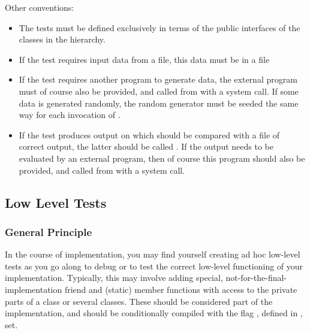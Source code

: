 Other conventions:

\begin{itemize}
\item
The tests must be defined exclusively in terms of the
public interfaces of the classes in the hierarchy.

\item
If the test requires input data from a file, this data must
be in a file

\item
If the test requires another program to generate data, the
external program must of course also be provided, and called from
 with a system call. If some data is
generated randomly, the random generator must be seeded the same way for
each invocation of .

\item
If the test produces output on  which should be compared with
a file of correct output, the latter should be called
.
If the output needs to be evaluated by an external program, then
of course this program should also be provided, and called from
 with a system call.

\end{itemize}

\subsection{Low Level Tests} %

\subsubsection{General Principle}

In the course of implementation, you may find yourself creating ad hoc
low-level tests as you go along to debug or to test the correct
low-level functioning of your implementation.  Typically, this may
involve adding special, not-for-the-final-implementation friend and
(static) member functions with access to the private parts of a class
or several classes.  These should be considered part of the
implementation, and should be conditionally compiled with the flag
, defined in , set.

